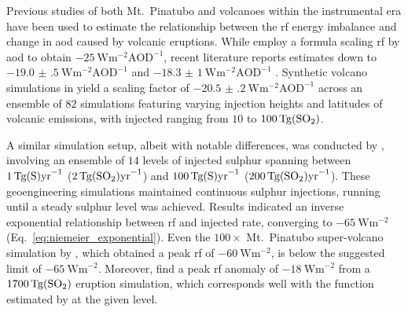 \documentclass{ametsocV6.1}
\newcommand{\iso}[1][i]{{#1}njected \ce{SO2}}
\begin{document}
Previous studies of both Mt.\ Pinatubo \citep{mills2017,hansen2005} and volcanoes within
the instrumental era \citep{gregory2016} have been used to estimate the relationship
between the \gls{rf} energy imbalance and change in \gls{aod} caused by volcanic
eruptions. While \citet{myhre2013} employ a formula scaling \gls{rf} by \gls{aod} to
obtain \(\SI{-25}{\watt\metre^{-2}\mathrm{AOD}^{-1}}\), recent literature reports
estimates down to \(\SI{-19.0(5)}{\watt\metre^{-2}\mathrm{AOD}^{-1}}\)
\citep{gregory2016} and \(\SI{-18.3(10)}{\watt\metre^{-2}\mathrm{AOD}^{-1}}\)
\citep{mills2017}. Synthetic volcano simulations in \citet{marshall2020} yield a scaling
factor of \(\SI{-20.5(2)}{\watt\metre^{-2}\mathrm{AOD}^{-1}}\) across an ensemble of
\(82\) simulations featuring varying injection heights and latitudes of volcanic
emissions, with \iso{} ranging from \(10\) to \(\SI{100}{\tera\gram(\ce{SO2})}\).

A similar simulation setup, albeit with notable differences, was conducted
by \citet{niemeier2015}, involving an ensemble of \(14\) levels of injected sulphur
spanning between \(\SI{1}{\tera\gram(\ce{S})\mathrm{yr}^{-1}}\)
(\(\SI{2}{\tera\gram(\ce{SO2})\mathrm{yr}^{-1}}\)) and
\(\SI{100}{\tera\gram(\ce{S})\mathrm{yr}^{-1}}\)
(\(\SI{200}{\tera\gram(\ce{SO2})\mathrm{yr}^{-1}}\)). These geoengineering simulations
maintained continuous sulphur injections, running until a steady sulphur level was
achieved. Results indicated an inverse exponential relationship between \gls{rf} and
\iso{} rate, converging to \(\SI{-65}{\watt\metre^{-2}}\)
(Eq.~\ref{eq:niemeier_exponential}). Even the \(100\times\) Mt.\ Pinatubo
super-volcano simulation by \citet{jones2005}, which obtained a peak \gls{rf} of
\(\SI{-60}{\watt\metre^{-2}}\), is below the suggested limit of
\(\SI{-65}{\watt\metre^{-2}}\). Moreover, \citet{timmreck2010} find a peak \gls{rf}
anomaly of \(\SI{-18}{\watt\metre^{-2}}\) from a \(\SI{1700}{\tera\gram(\ce{SO2})}\)
eruption simulation, which corresponds well with the function estimated by
\citet{niemeier2015} at the given  level.
\end{document}
